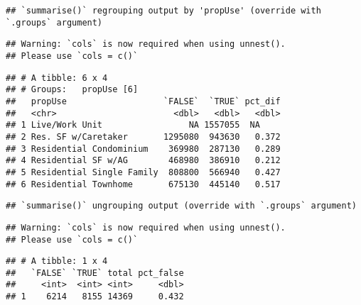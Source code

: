 \documentclass[]{article}
\newenvironment{Shaded}{\begin{snugshade}}{\end{snugshade}}
\newcommand{\DataTypeTok}[1]{\textcolor[rgb]{0.13,0.29,0.53}{#1}}
\newcommand{\KeywordTok}[1]{\textcolor[rgb]{0.13,0.29,0.53}{\textbf{#1}}}
\newcommand{\NormalTok}[1]{#1}
\newcommand{\OperatorTok}[1]{\textcolor[rgb]{0.81,0.36,0.00}{\textbf{#1}}}
\newcommand{\StringTok}[1]{\textcolor[rgb]{0.31,0.60,0.02}{#1}}
\begin{document}
\begin{verbatim}
## `summarise()` regrouping output by 'propUse' (override with `.groups` argument)
\end{verbatim}

\begin{verbatim}
## Warning: `cols` is now required when using unnest().
## Please use `cols = c()`
\end{verbatim}

\begin{verbatim}
## # A tibble: 6 x 4
## # Groups:   propUse [6]
##   propUse                   `FALSE`  `TRUE` pct_dif
##   <chr>                       <dbl>   <dbl>   <dbl>
## 1 Live/Work Unit                 NA 1557055  NA    
## 2 Res. SF w/Caretaker       1295080  943630   0.372
## 3 Residential Condominium    369980  287130   0.289
## 4 Residential SF w/AG        468980  386910   0.212
## 5 Residential Single Family  808800  566940   0.427
## 6 Residential Townhome       675130  445140   0.517
\end{verbatim}

\begin{Shaded}
\end{Shaded}

\begin{verbatim}
## `summarise()` ungrouping output (override with `.groups` argument)
\end{verbatim}

\begin{verbatim}
## Warning: `cols` is now required when using unnest().
## Please use `cols = c()`
\end{verbatim}

\begin{verbatim}
## # A tibble: 1 x 4
##   `FALSE` `TRUE` total pct_false
##     <int>  <int> <int>     <dbl>
## 1    6214   8155 14369     0.432
\end{verbatim}
\end{document}
